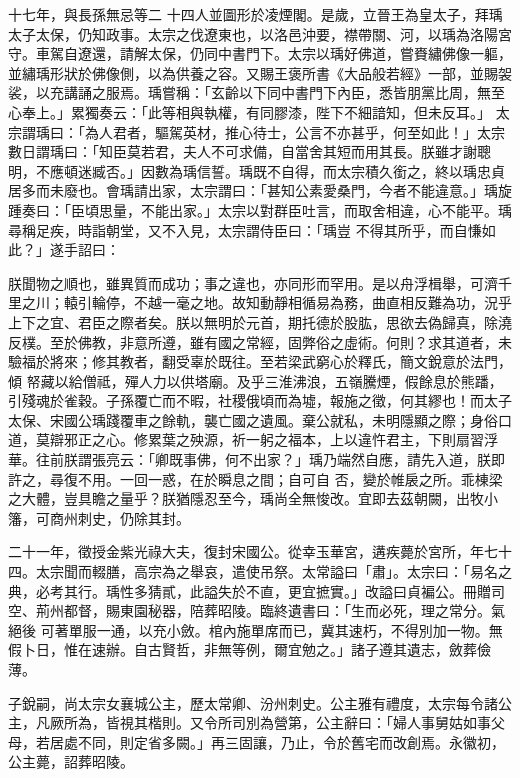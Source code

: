 \begin{pinyinscope}
 十七年，與長孫無忌等二
 十四人並圖形於凌煙閣。是歲，立晉王為皇太子，拜瑀太子太保，仍知政事。太宗之伐遼東也，以洛邑沖要，襟帶關、河，以瑀為洛陽宮守。車駕自遼還，請解太保，仍同中書門下。太宗以瑀好佛道，嘗賚繡佛像一軀，並繡瑀形狀於佛像側，以為供養之容。又賜王褒所書《大品般若經》一部，並賜袈裟，以充講誦之服焉。瑀嘗稱：「玄齡以下同中書門下內臣，悉皆朋黨比周，無至心奉上。」累獨奏云：「此等相與執權，有同膠漆，陛下不細諳知，但未反耳。」
 太宗謂瑀曰：「為人君者，驅駕英材，推心待士，公言不亦甚乎，何至如此！」太宗數日謂瑀曰：「知臣莫若君，夫人不可求備，自當舍其短而用其長。朕雖才謝聰明，不應頓迷臧否。」因數為瑀信誓。瑀既不自得，而太宗積久銜之，終以瑀忠貞居多而未廢也。會瑀請出家，太宗謂曰：「甚知公素愛桑門，今者不能違意。」瑀旋踵奏曰：「臣頃思量，不能出家。」太宗以對群臣吐言，而取舍相違，心不能平。瑀尋稱足疾，時詣朝堂，又不入見，太宗謂侍臣曰：「瑀豈
 不得其所乎，而自慊如此？」遂手詔曰：



 朕聞物之順也，雖異質而成功；事之違也，亦同形而罕用。是以舟浮楫舉，可濟千里之川；轅引輪停，不越一毫之地。故知動靜相循易為務，曲直相反難為功，況乎上下之宜、君臣之際者矣。朕以無明於元首，期托德於股肱，思欲去偽歸真，除澆反樸。至於佛教，非意所遵，雖有國之常經，固弊俗之虛術。何則？求其道者，未驗福於將來；修其教者，翻受辜於既往。至若梁武窮心於釋氏，簡文銳意於法門，傾
 帑藏以給僧祗，殫人力以供塔廟。及乎三淮沸浪，五嶺騰煙，假餘息於熊蹯，引殘魂於雀穀。子孫覆亡而不暇，社稷俄頃而為墟，報施之徵，何其繆也！而太子太保、宋國公瑀踐覆車之餘軌，襲亡國之遺風。棄公就私，未明隱顯之際；身俗口道，莫辯邪正之心。修累葉之殃源，祈一躬之福本，上以違忤君主，下則扇習浮華。往前朕謂張亮云：「卿既事佛，何不出家？」瑀乃端然自應，請先入道，朕即許之，尋復不用。一回一惑，在於瞬息之間；自可自
 否，變於帷扆之所。乖棟梁之大體，豈具瞻之量乎？朕猶隱忍至今，瑀尚全無悛改。宜即去茲朝闕，出牧小籓，可商州刺史，仍除其封。



 二十一年，徵授金紫光祿大夫，復封宋國公。從幸玉華宮，遘疾薨於宮所，年七十四。太宗聞而輟膳，高宗為之舉哀，遣使吊祭。太常謚曰「肅」。太宗曰：「易名之典，必考其行。瑀性多猜貳，此謚失於不直，更宜摭實。」改謚曰貞褊公。冊贈司空、荊州都督，賜東園秘器，陪葬昭陵。臨終遺書曰：「生而必死，理之常分。氣絕後
 可著單服一通，以充小斂。棺內施單席而已，冀其速朽，不得別加一物。無假卜日，惟在速辦。自古賢哲，非無等例，爾宜勉之。」諸子遵其遺志，斂葬儉薄。



 子銳嗣，尚太宗女襄城公主，歷太常卿、汾州刺史。公主雅有禮度，太宗每令諸公主，凡厥所為，皆視其楷則。又令所司別為營第，公主辭曰：「婦人事舅姑如事父母，若居處不同，則定省多闕。」再三固讓，乃止，令於舊宅而改創焉。永徽初，公主薨，詔葬昭陵。




\end{pinyinscope}
